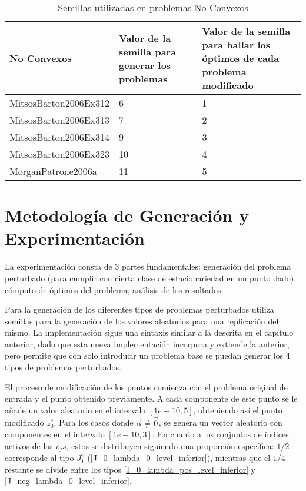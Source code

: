     \begin{table}[h!]
        \centering
        \caption{Semillas utilizadas en problemas No Convexos}
        \begin{adjustbox}{max width=\textwidth}
        \begin{tabular}{ | m{5cm} | m{5cm} | m{5cm} | }
          
          \hline
          \textbf{No Convexos} & \textbf{Valor de la semilla para generar los problemas}  & \textbf{Valor de la semilla para hallar los óptimos de cada problema modificado} \\
          \hline
          MitsosBarton2006Ex312 & 6  & 1\\
          \hline
          MitsosBarton2006Ex313 & 7 & 2 \\
          \hline
          MitsosBarton2006Ex314 & 9 & 3\\
          \hline
          MitsosBarton2006Ex323 & 10 & 4\\
          \hline
          MorganPatrone2006a & 11 & 5 \\
          \hline
        \end{tabular}
     \end{adjustbox}
    \end{table}

    \section{Metodología de Generación y Experimentación}
    La experimentación consta de 3 partes fundamentales: generación del problema perturbado (para cumplir con cierta clase de estacionariedad en un punto dado), cómputo de óptimos del problema, análisis de los resultados.

    Para la generación de los diferentes tipos de problemas perturbados utiliza semillas para la generación de los valores aleatorios para una replicación del mismo.
    La implementación sigue una sintaxis similar a la descrita en el capítulo anterior, dado que esta nueva implementación incorpora y extiende la anterior, pero permite 
    que con solo introducir un problema base se puedan generar los 4 tipos de problemas perturbados.
    
    El proceso de modificación de los puntos comienza con el problema original de entrada y el punto obtenido previamente. A cada componente de este punto se le añade un valor aleatorio en el intervalo $[1e-10, 5]$, obteniendo así el punto modificado $z^*_0$. Para los casos donde $\vec{\alpha}\neq \vec{0}$, se genera un vector aleatorio con componentes en el intervalo $[1e-10, 3]$. En cuanto a los conjuntos de índices activos de las $v_{j}s$, estos se distribuyen siguiendo una proporción específica: $1/2$ corresponde al tipo $J_1^v$ (\ref{J_0_lambda_0_level_inferior}), mientras que el $1/4$ restante se divide entre los tipos \ref{J_0_lambda_pos_level_inferior} y \ref{J_neg_lambda_0_level_inferior}.
    
